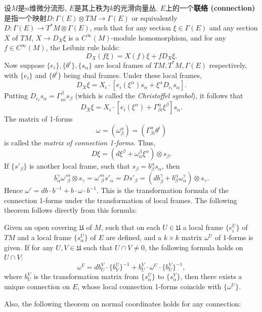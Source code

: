 
设$M$是$n$维微分流形, $E$是其上秩为$k$的光滑向量丛. $E$上的一个\textbf{联络 (connection) }是指一个映射$D:\Gamma(E)\otimes TM\to\Gamma(E)$ or equivalently $D:\Gamma(E)\to T^*M\otimes\Gamma(E)$, such that for any section $\xi\in\Gamma(E)$ and any section $X$ of $TM$, $X\to D_X\xi$ is a $C^\infty(M)$-module homomorphism, and for any $f\in C^\infty(M)$, the Leibniz rule holds:
$$D_X(f\xi)=X(f)\xi+fD_X\xi.$$
Now suppose $\{e_i\},\{\theta^i\},\{s_\alpha\}$ are local frames of $TM,T^*M,\Gamma(E)$ respectively, with $\{e_i\}$ and $\{\theta^i\}$ being dual frames. Under these local frames,
$$D_X\xi=X_i\cdot\left[e_i(\xi^\alpha)s_\alpha+\xi^\alpha D_{e_i}s_\alpha\right].$$
Putting $D_{e_i}s_\alpha=\Gamma_{\alpha i}^\beta s_\beta$ (which is called the \emph{Christoffel symbol}), it follows that
$$D_X\xi=X_i\cdot\left[e_i(\xi^\alpha)+\Gamma_{\beta i}^\alpha\xi^\beta \right]s_\alpha.$$
The matrix of 1-forms
$$\omega=(\omega_\beta^\alpha)=(\Gamma_{\beta i}^\alpha\theta^i)$$
is called the \emph{matrix of connection 1-forms}. Thus,
$$D\xi=(d\xi^\beta+\omega_\alpha^\beta\xi^\alpha)\otimes s_\beta.$$
If $\{s'_\beta\}$ is another local frame, such that $s_\beta=b_\beta^\alpha s_\alpha$, then
$$b_\alpha^\gamma{\omega'}_{\beta}^{\alpha}\otimes s_\gamma={\omega'}_{\beta}^{\alpha}s'_\alpha=Ds'_\beta=(db_\beta^\gamma+b_\beta^\alpha\omega_\alpha^\gamma)\otimes s_\gamma.$$
Hence $\omega'=db\cdot b^{-1}+b\cdot\omega\cdot b^{-1}$. This is the transformation formula of the connection 1-forms under the transformation of local frames. The following theorem follows directly from this formula:

\begin{theorem}{}
Given an open covering $\mathfrak{U}$ of $M$, such that on each $U\in\mathfrak{U}$ a local frame $\{e^U_i\}$ of $TM$ and a local frame $\{s^U_\alpha\}$ of $E$ are defined, and a $k\times k$ matrix $\omega^U$ of 1-forms is given. If for any $U,V\in\mathfrak{U}$ such that $U\cap V\neq0$, the following formula holds on $U\cap V$:
$$\omega^V=db^V_U\cdot \{b_V^U\}^{-1}+b^V_U\cdot\omega^U\cdot \{b^V_U\}^{-1},$$
where $b^V_U$ is the transformation matrix from $\{s^U_\alpha\}$ to $\{s^V_\alpha\}$, then there exists a unique connection on $E$, whose local connection 1-forms coincide with $\{\omega^U\}$.
\end{theorem}

Also, the following theorem on normal coordinates holds for any connection:

